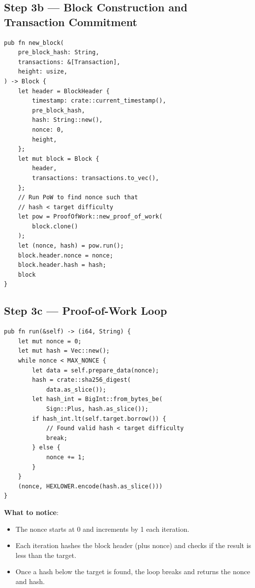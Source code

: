 \subsection{Step 3b --- Block Construction and Transaction Commitment}
\label{sec:ch09-6-step3b}

\begin{listing}[H]
\caption{Block construction + proof-of-work ()}
\label{lst:9-6-7}
\begin{verbatim}
pub fn new_block(
    pre_block_hash: String,
    transactions: &[Transaction],
    height: usize,
) -> Block {
    let header = BlockHeader {
        timestamp: crate::current_timestamp(),
        pre_block_hash,
        hash: String::new(),
        nonce: 0,
        height,
    };
    let mut block = Block {
        header,
        transactions: transactions.to_vec(),
    };
    // Run PoW to find nonce such that
    // hash < target difficulty
    let pow = ProofOfWork::new_proof_of_work(
        block.clone()
    );
    let (nonce, hash) = pow.run();
    block.header.nonce = nonce;
    block.header.hash = hash;
    block
}
\end{verbatim}
\end{listing}

\subsection{Step 3c --- Proof-of-Work Loop}
\label{sec:ch09-6-step3c}

\begin{listing}[H]
\caption{Proof-of-work search ()}
\label{lst:9-6-8}
\begin{verbatim}
pub fn run(&self) -> (i64, String) {
    let mut nonce = 0;
    let mut hash = Vec::new();
    while nonce < MAX_NONCE {
        let data = self.prepare_data(nonce);
        hash = crate::sha256_digest(
            data.as_slice());
        let hash_int = BigInt::from_bytes_be(
            Sign::Plus, hash.as_slice());
        if hash_int.lt(self.target.borrow()) {
            // Found valid hash < target difficulty
            break;
        } else {
            nonce += 1;
        }
    }
    (nonce, HEXLOWER.encode(hash.as_slice()))
}
\end{verbatim}
\end{listing}

\textbf{What to notice}:
\begin{itemize}
  \item The nonce starts at 0 and increments by 1 each iteration.
  \item Each iteration hashes the block header (plus nonce) and checks if the result is less than the target.
  \item Once a hash below the target is found, the loop breaks and returns the nonce and hash.
\end{itemize}


